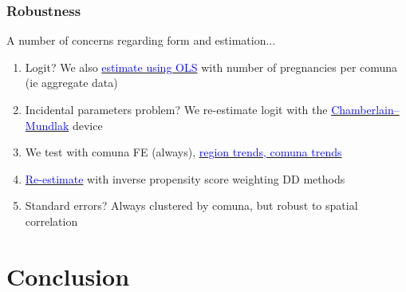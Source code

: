 \documentclass[10pt,letterpaper,subeqn]{beamer}
\begin{document}

\begin{frame}[label=robust]
\frametitle{Robustness}
A number of concerns regarding form and estimation...
\vspace{5mm}
\begin{enumerate}
\item Logit? We also \hyperlink{agg}{\textcolor{blue}{estimate using OLS}} with number of pregnancies per comuna (ie aggregate
data)
\item Incidental parameters problem?  We re-estimate logit with the \hyperlink{CM}{\textcolor{blue}{Chamberlain--Mundlak}} device
\item We test with comuna FE (always), \hyperlink{trends}{\textcolor{blue}{region trends, comuna trends}}
\item \hyperlink{propensity}{\textcolor{blue}{Re-estimate}} with inverse propensity score weighting DD methods
\item Standard errors?  Always clustered by comuna, but robust to spatial correlation
\end{enumerate}
\end{frame}

\section{Conclusion}
\end{document}
